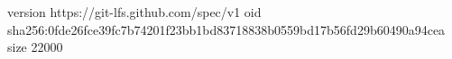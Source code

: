version https://git-lfs.github.com/spec/v1
oid sha256:0fde26fce39fc7b74201f23bb1bd83718838b0559bd17b56fd29b60490a94cea
size 22000
